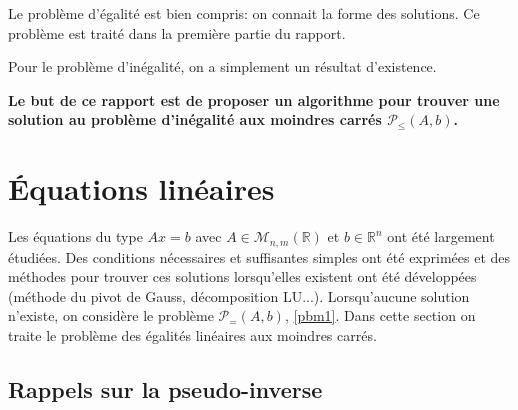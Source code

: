 \documentclass[10pt,a4paper]{article}
\begin{document}
Le problème d'égalité est bien compris: on connait la forme des solutions.
Ce problème est traité dans la première partie du rapport.

Pour le problème d'inégalité, on a simplement un résultat d'existence.

\textbf{Le but de ce rapport est de proposer un algorithme pour trouver une solution au problème d'inégalité aux moindres carrés $\mathcal{P}_{\leq} (A, b)$.}

\section{Équations linéaires}

Les équations du type $Ax=b$ avec $A \in \mathcal{M}_{n,m}(\mathbb{R})$ et $b \in \mathbb{R}^n$ ont été largement étudiées. Des conditions nécessaires et suffisantes simples ont été exprimées et des méthodes pour trouver ces solutions lorsqu'elles existent ont été développées (méthode du pivot de Gauss, décomposition LU...). Lorsqu'aucune solution n'existe, on considère le problème $\mathcal{P}_{=}(A,b)$, \ref{pbm1}. Dans cette section on traite le problème des égalités linéaires aux moindres carrés.

\subsection{Rappels sur la pseudo-inverse}
\end{document}
